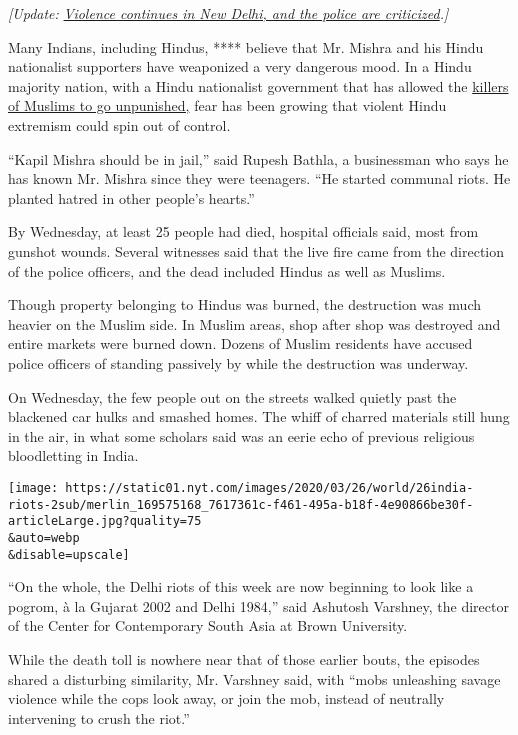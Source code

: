 \emph{{[}Update:}
\href{http://www.nytimes.com/2020/02/27/world/asia/india-violence-hindu-muslim.html}{\emph{Violence
continues in New Delhi, and the police are criticized}}\emph{.{]}}

Many Indians, including Hindus, **** believe that Mr. Mishra and his
Hindu nationalist supporters have weaponized a very dangerous mood. In a
Hindu majority nation, with a Hindu nationalist government that has
allowed the
\href{https://www.nytimes.com/2019/02/18/world/asia/india-cow-religious-attacks.html}{killers
of Muslims to go unpunished,} fear has been growing that violent Hindu
extremism could spin out of control.

``Kapil Mishra should be in jail,'' said Rupesh Bathla, a businessman
who says he has known Mr. Mishra since they were teenagers. ``He started
communal riots. He planted hatred in other people's hearts.''

By Wednesday, at least 25 people had died, hospital officials said, most
from gunshot wounds. Several witnesses said that the live fire came from
the direction of the police officers, and the dead included Hindus as
well as Muslims.

Though property belonging to Hindus was burned, the destruction was much
heavier on the Muslim side. In Muslim areas, shop after shop was
destroyed and entire markets were burned down. Dozens of Muslim
residents have accused police officers of standing passively by while
the destruction was underway.

On Wednesday, the few people out on the streets walked quietly past the
blackened car hulks and smashed homes. The whiff of charred materials
still hung in the air, in what some scholars said was an eerie echo of
previous religious bloodletting in India.

\texttt{[image: https://static01.nyt.com/images/2020/03/26/world/26india-riots-2sub/merlin\_169575168\_7617361c-f461-495a-b18f-4e90866be30f-articleLarge.jpg?quality=75\\\&auto=webp\\\&disable=upscale]}

``On the whole, the Delhi riots of this week are now beginning to look
like a pogrom, à la Gujarat 2002 and Delhi 1984,'' said Ashutosh
Varshney, the director of the Center for Contemporary South Asia at
Brown University.

While the death toll is nowhere near that of those earlier bouts, the
episodes shared a disturbing similarity, Mr. Varshney said, with ``mobs
unleashing savage violence while the cops look away, or join the mob,
instead of neutrally intervening to crush the riot.''

